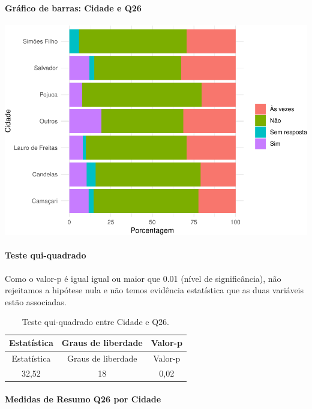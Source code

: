 \documentclass[]{article}
\let\oldparagraph\paragraph
\renewcommand{\paragraph}[1]{\oldparagraph{#1}\mbox{}}
\begin{document}
\hypertarget{gruxe1fico-de-barras-cidade-e-q26}{%
\paragraph{Gráfico de barras: Cidade e Q26}\label{gruxe1fico-de-barras-cidade-e-q26}}

\begin{center}\includegraphics[width=0.75\linewidth]{relatorio_covid19_files/figure-latex/unnamed-chunk-722-1} \end{center}

\hypertarget{teste-qui-quadrado-62}{%
\paragraph{Teste qui-quadrado}\label{teste-qui-quadrado-62}}

Como o valor-p é igual igual ou maior que 0.01 (nível de significância), não rejeitamos a hipótese nula e não temos evidência estatística que as duas variáveis estão associadas.

\begin{longtable}[]{@{}ccc@{}}
\caption{\label{tab:unnamed-chunk-724}Teste qui-quadrado entre Cidade e Q26.}\tabularnewline
\toprule
Estatística & Graus de liberdade & Valor-p\tabularnewline
\midrule
\endfirsthead
\toprule
Estatística & Graus de liberdade & Valor-p\tabularnewline
\midrule
\endhead
32,52 & 18 & 0,02\tabularnewline
\bottomrule
\end{longtable}

\cleardoublepage

\hypertarget{medidas-de-resumo-q26-por-cidade}{%
\paragraph{Medidas de Resumo Q26 por Cidade}\label{medidas-de-resumo-q26-por-cidade}}
\end{document}

